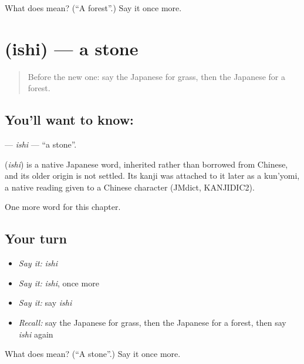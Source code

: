 \begin{tcolorbox}[breakable,colback=teal!4,colframe=teal!35!black,title={Before you move on}]
What does  mean? (\textquotedblleft{}A forest\textquotedblright{}.) Say it once more.
\end{tcolorbox}
\section[\texorpdfstring{\ja{いし} (ishi)}{いし (ishi)}]{ (ishi) — a stone}

\label{lesson:JA-C42-ishi}



\begin{quote}
Before the new one: say the Japanese for grass, then the Japanese for a forest.
\end{quote}

\subsection*{You'll want to know: }
\textbf{} — \emph{ishi} — \textquotedblleft{}a stone\textquotedblright{}.

\begin{cousinweb}
\textbf{} (\emph{ishi}) is a native Japanese word, inherited rather than borrowed from Chinese, and its older origin is not settled. Its kanji was attached to it later as a kun'yomi, a native reading given to a Chinese character (JMdict, KANJIDIC2).
\end{cousinweb}

\begin{grammarlens}[title={What you've built}]
One more word for this chapter.
\end{grammarlens}

\subsection*{Your turn}
\begin{itemize}
\raggedright
  \item \emph{Say it:} \emph{ishi}
  \item \emph{Say it:} \emph{ishi}, once more
  \item \emph{Say it:} say \emph{ishi}
  \item \emph{Recall:} say the Japanese for grass, then the Japanese for a forest, then say \emph{ishi} again
\end{itemize}

\begin{tcolorbox}[breakable,colback=teal!4,colframe=teal!35!black,title={Before you move on}]
What does  mean? (\textquotedblleft{}A stone\textquotedblright{}.) Say it once more.
\end{tcolorbox}
